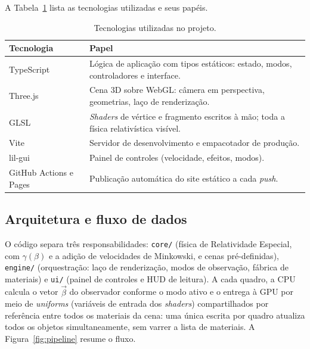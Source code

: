 \documentclass[10pt,a4paper,twocolumn]{article}
\begin{document}
A Tabela~\ref{tab:stack} lista as tecnologias utilizadas e seus papéis.

\begin{table}[t]
  \centering
  \caption{Tecnologias utilizadas no projeto.}
  \label{tab:stack}
  \small
  \begin{tabular}{@{}>{\raggedright\arraybackslash}p{}p{}@{}}
    \toprule
    Tecnologia & Papel \\
    \midrule
    TypeScript & Lógica de aplicação com tipos estáticos: estado, modos,
                 controladores e interface. \\
    Three.js   & Cena 3D sobre WebGL: câmera em perspectiva, geometrias,
                 laço de renderização. \\
    GLSL       & \emph{Shaders} de vértice e fragmento escritos à mão; toda a
                 física relativística visível. \\
    Vite       & Servidor de desenvolvimento e empacotador de produção. \\
    lil-gui    & Painel de controles (velocidade, efeitos, modos). \\
    GitHub Actions e Pages & Publicação automática do site estático a cada
                 \emph{push}. \\
    \bottomrule
  \end{tabular}
\end{table}

\subsection{Arquitetura e fluxo de dados}

O código separa três responsabilidades: \texttt{core/} (física de Relatividade Especial,
com $\gamma(\beta)$ e a adição de velocidades de Minkowski, e cenas pré-definidas),
\texttt{engine/} (orquestração: laço de renderização, modos de observação, fábrica de
materiais)
e \texttt{ui/} (painel de controles e HUD de leitura). A cada quadro, a CPU calcula o vetor
$\vec{\beta}$ do observador conforme o modo ativo e o entrega à GPU por meio de
\emph{uniforms} (variáveis de entrada dos \emph{shaders}) compartilhados por
referência entre todos os materiais da cena: uma única escrita por quadro atualiza todos
os objetos simultaneamente, sem varrer a lista de materiais. A Figura~\ref{fig:pipeline}
resume o fluxo.
\end{document}
